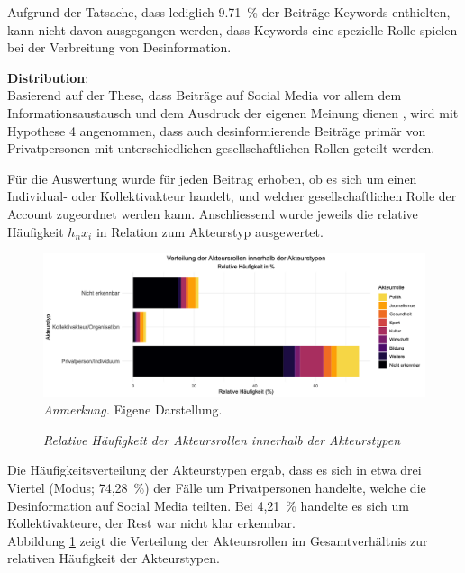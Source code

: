 \documentclass[12pt,a4paper]{article}        %
\begin{document}
Aufgrund der Tatsache, dass lediglich 9.71 \% der Beiträge Keywords enthielten, kann nicht davon ausgegangen werden, dass Keywords eine spezielle Rolle spielen bei der Verbreitung von Desinformation. 

\textbf{Distribution}:\\
Basierend auf der These, dass Beiträge auf Social Media vor allem dem Informationsaustausch und dem Ausdruck der eigenen Meinung dienen \parencites[vgl.\ dazu][77]{lecheler_disinformation_2022}{subramanian_meet_2017}[182]{weidner_fake_2019}, wird mit Hypothese 4 angenommen, dass auch desinformierende Beiträge primär von Privatpersonen mit unterschiedlichen gesellschaftlichen Rollen geteilt werden.

Für die Auswertung wurde für jeden Beitrag erhoben, ob es sich um einen Individual- oder Kollektivakteur handelt, und welcher gesellschaftlichen Rolle der Account zugeordnet werden kann. Anschliessend wurde jeweils die relative Häufigkeit \({h_n}{x_i}\) in Relation zum Akteurstyp ausgewertet.

\begin{figure}[H]
  \caption{\textit{Relative Häufigkeit der Akteursrollen innerhalb der Akteurstypen}}
  \label{fig:results_actor_plot}
  \centering
  \includegraphics[width=1\linewidth]{images/actor_plot.png}
  \footnotesize\textit{Anmerkung.} Eigene Darstellung.
\end{figure}
Die Häufigkeitsverteilung der Akteurstypen ergab, dass es sich in etwa drei Viertel (Modus; 74,28 \%) der Fälle um Privatpersonen handelte, welche die Desinformation auf Social Media teilten. Bei 4,21 \% handelte es sich um Kollektivakteure, der Rest war nicht klar erkennbar.\\
Abbildung \ref{fig:results_actor_plot} zeigt die Verteilung der Akteursrollen im Gesamtverhältnis zur relativen Häufigkeit der Akteurstypen.
\end{document}
